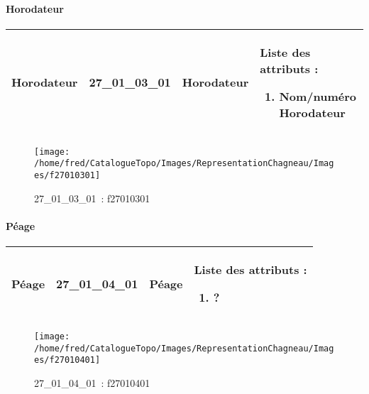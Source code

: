\documentclass[12pt,titlepage]{book}
\begin{document}
\paragraph{Horodateur}
\noindent
\vspace{\baselineskip}

\renewcommand{\arraystretch}{1.2}
\begin{supertabular}{|p{10cm}|c|p{13cm}|p{12cm}|}
 Horodateur & 27\_01\_03\_01 & Horodateur & Liste des attributs :
\begin{enumerate}
  \item Nom/numéro Horodateur\end{enumerate}
\\
\hline
\end{supertabular}
\begin{figure}[h!]
  \hfill         %
  \begin{minipage}[t]{3cm}
    \begin{center}
      \texttt{[image: /home/fred/CatalogueTopo/Images/RepresentationChagneau/Images/f27010301]}
      \caption[~27\_01\_03\_01]{\small{27\_01\_03\_01~:} \tiny{f27010301}}\label{f27010301}
    \end{center}
  \end{minipage}
\end{figure}


\paragraph{Péage}
\noindent
\vspace{\baselineskip}

\renewcommand{\arraystretch}{1.2}
\begin{supertabular}{|p{10cm}|c|p{13cm}|p{12cm}|}
 Péage & 27\_01\_04\_01 & Péage & Liste des attributs :
\begin{enumerate}
  \item ?\end{enumerate}
\\
\hline
\end{supertabular}
\begin{figure}[h!]
  \hfill         %
  \begin{minipage}[t]{3cm}
    \begin{center}
      \texttt{[image: /home/fred/CatalogueTopo/Images/RepresentationChagneau/Images/f27010401]}
      \caption[~27\_01\_04\_01]{\small{27\_01\_04\_01~:} \tiny{f27010401}}\label{f27010401}
    \end{center}
  \end{minipage}
\end{figure}
\end{document}
